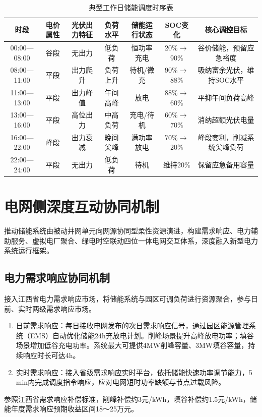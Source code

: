 \documentclass[12pt,a4paper]{article}
\begin{document}
\begin{table}[H]
\centering
\caption{典型工作日储能调度时序表}
\label{tab:schedule}
\begin{tabular}{ccccccc}
\toprule
时段 & 电价属性 & 光伏出力特征 & 负荷水平 & 储能运行状态 & SOC变化 & 核心调控目标 \\
\midrule
00:00—08:00 & 谷段 & 无出力 & 低负荷 & 恒功率充电 & 20\%$\to$90\% & 谷价储能，预留应急裕度 \\
08:00—11:00 & 平段 & 出力爬升 & 负荷上升 & 待机/微充 & 90\%$\to$88\% & 吸纳富余光伏，维持SOC水平 \\
11:00—13:00 & 平段 & 出力峰值 & 午间高峰 & 放电 & 88\%$\to$60\% & 平抑午间负荷高峰 \\
13:00—16:00 & 平段 & 高位出力 & 中高负荷 & 充电/待机 & 60\%$\to$70\% & 消纳超额光伏电量 \\
16:00—22:00 & 峰段 & 出力衰减 & 晚间尖峰 & 满功率放电 & 70\%$\to$20\% & 峰段套利，削减系统尖峰负荷 \\
22:00—24:00 & 平段 & 无出力 & 低负荷 & 待机 & 维持20\% & 保留应急备用容量 \\
\bottomrule
\end{tabular}
\end{table}

\section{电网侧深度互动协同机制}
推动储能系统由被动并网单元向网源协同型柔性资源演进，构建需求响应、电力辅助服务、虚拟电厂聚合、绿电时空联动四位一体电网交互体系，深度融入新型电力系统运行框架。

\subsection{电力需求响应协同机制}
接入江西省电力需求响应市场，将储能系统与园区可调负荷进行资源聚合，参与日前、实时两级需求响应市场。
\begin{enumerate}
    \item 日前需求响应：每日接收电网发布的次日需求响应信号，通过园区能源管理系统（EMS）自动优化储能24h充放电计划。削峰场景提升高峰放电功率；填谷场景增加低谷充电功率。系统最大可提供4MW削峰容量、3MW填谷容量，持续响应时长可达4h。
    \item 实时需求响应：接入省级需求响应实时平台，依托储能快速功率调节能力，5 min内完成调度指令响应，应对电网短时功率缺额与节点过载风险。
\end{enumerate}
参照江西省需求响应补偿标准，削峰补偿约3元/kWh，填谷补偿约1.5元/kWh，储能年度需求响应预期收益区间18～25万元。
\end{document}
